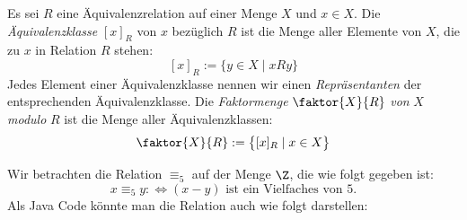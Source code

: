 \begin{df}
Es sei $R$ eine Äquivalenzrelation auf einer Menge $X$ und $x\in X$. Die \textit{Äquivalenzklasse} $[x]_R$ von $x$ bezüglich $R$ ist die Menge aller Elemente von $X$, die zu $x$ in Relation $R$ stehen:
\[
[x]_R:=\{y\in X\mid xRy \}
\]
Jedes Element einer Äquivalenzklasse nennen wir einen \textit{Repräsentanten} der entsprechenden Äquivalenzklasse. Die \textit{Faktormenge} $\faktor{X}{R}$ \textit{von} $X$ \textit{modulo} $R$ ist die Menge aller Äquivalenzklassen:
\[
\faktor{X}{R}:=\big\{ [x]_R\mid x\in X \big\}
\]
\end{df}

\begin{bsp}\label{bsp:modulo5relation}
Wir betrachten die Relation $\equiv_5$ auf der Menge $\Z$, die wie folgt gegeben ist:
\[
x\equiv_5 y:\Leftrightarrow (x-y)\text{ ist ein Vielfaches von  }5.
\]
Als Java Code könnte man die Relation auch wie folgt darstellen:


\end{bsp}
